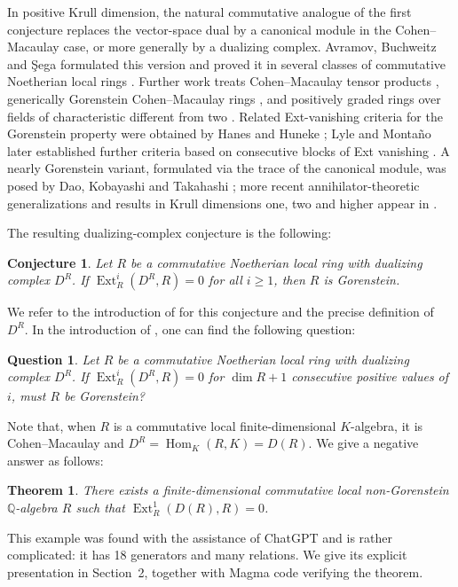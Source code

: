 \documentclass[a4paper]{amsart}
\newtheorem{theorem}{Theorem}[section]
\newtheorem*{conjecture}{Conjecture}
\newtheorem*{question}{Question}
\theoremstyle{definition}
\theoremstyle{remark}
\numberwithin{equation}{section}
\newcommand{\Ext}{\operatorname{Ext}}
\newcommand{\Hom}{\operatorname{Hom}}
\begin{document}
In positive Krull dimension, the natural commutative analogue of the first conjecture replaces the vector-space dual by a canonical module in the Cohen--Macaulay case, or more generally by a dualizing complex. Avramov, Buchweitz and \c{S}ega formulated this version and proved it in several classes of commutative Noetherian local rings \cite{ABS}. Further work treats Cohen--Macaulay tensor products \cite{Jor}, generically Gorenstein Cohen--Macaulay rings \cite{GT}, and positively graded rings over fields of characteristic different from two \cite{LMSW}. Related Ext-vanishing criteria for the Gorenstein property were obtained by Hanes and Huneke \cite{HH}; Lyle and Monta\~no later established further criteria based on consecutive blocks of Ext vanishing \cite{LM}. A nearly Gorenstein variant, formulated via the trace of the canonical module, was posed by Dao, Kobayashi and Takahashi \cite{DKT}; more recent annihilator-theoretic generalizations and results in Krull dimensions one, two and higher appear in \cite{Es}.

The resulting dualizing-complex conjecture is the following:
\begin{conjecture}
Let $R$ be a commutative Noetherian local ring with dualizing complex $D^R$. If $\Ext_R^i(D^R,R)=0$ for all $i \geq 1$, then $R$ is Gorenstein.
\end{conjecture}
We refer to the introduction of \cite{ABS} for this conjecture and the precise definition of $D^R$.
In the introduction of \cite{ABS}, one can find the following question:
\begin{question}
Let $R$ be a commutative Noetherian local ring with dualizing complex $D^R$. If $\Ext_R^i(D^R,R)=0$ for $\dim R+1$ consecutive positive values of $i$, must $R$ be Gorenstein?
\end{question}
Note that, when $R$ is a commutative local finite-dimensional $K$-algebra, it is Cohen--Macaulay and $D^R=\Hom_K(R,K)=D(R)$.
We give a negative answer as follows:
\begin{theorem}
There exists a finite-dimensional commutative local non-Gorenstein $\mathbb{Q}$-algebra $R$ such that $\Ext_R^1(D(R),R)=0$.
\end{theorem}
This example was found with the assistance of ChatGPT and is rather complicated: it has 18 generators and many relations. We give its explicit presentation in Section~2, together with Magma code verifying the theorem.
\end{document}
